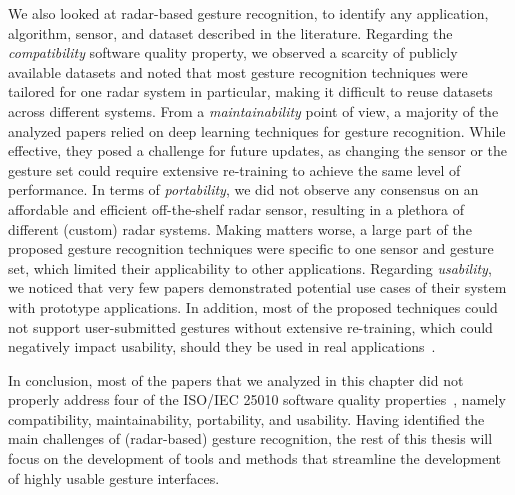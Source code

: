 We also looked at radar-based gesture recognition, to identify any application, algorithm, sensor, and dataset described in the literature. 
%
Regarding the \textit{compatibility} software quality property, we observed a scarcity of publicly available datasets and noted that most gesture recognition techniques were tailored for one radar system in particular, making it difficult to reuse datasets across different systems.
%
From a \textit{maintainability} point of view, a majority of the analyzed papers relied on deep learning techniques for gesture recognition. While effective, they posed a challenge for future updates, as changing the sensor or the gesture set could require extensive re-training to achieve the same level of performance.
%
In terms of \textit{portability}, we did not observe any consensus on an affordable and efficient off-the-shelf radar sensor, resulting in a plethora of different (custom) radar systems. Making matters worse, a large part of the proposed gesture recognition techniques were specific to one sensor and gesture set, which limited their applicability to other applications.
%
Regarding \textit{usability}, we noticed that very few papers demonstrated potential use cases of their system with prototype applications. In addition, most of the proposed techniques could not support user-submitted gestures without extensive re-training, which could negatively impact usability, should they be used in real applications~\cite{Nacenta:2013}.

In conclusion, most of the papers that we analyzed in this chapter did not properly address four of the ISO/IEC 25010 software quality properties~\cite{iso25010}, namely compatibility, maintainability, portability, and usability. 
%
Having identified the main challenges of (radar-based) gesture recognition, the rest of this thesis will focus on the development of tools and methods that streamline the development of highly usable gesture interfaces.
